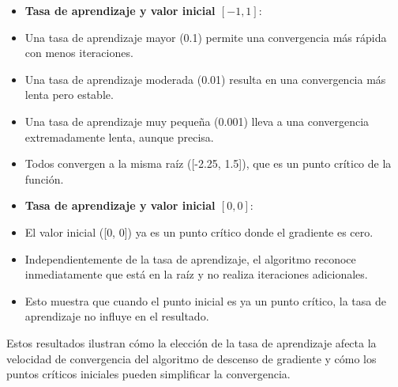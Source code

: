 \documentclass[11pt]{article}
\begin{document}
\begin{itemize}
\item
  \textbf{Tasa de aprendizaje y valor inicial \([-1, 1]\)}:
\item
  Una tasa de aprendizaje mayor (0.1) permite una convergencia más
  rápida con menos iteraciones.
\item
  Una tasa de aprendizaje moderada (0.01) resulta en una convergencia
  más lenta pero estable.
\item
  Una tasa de aprendizaje muy pequeña (0.001) lleva a una convergencia
  extremadamente lenta, aunque precisa.
\item
  Todos convergen a la misma raíz ({[}-2.25, 1.5{]}), que es un punto
  crítico de la función.
\item
  \textbf{Tasa de aprendizaje y valor inicial \([0, 0]\)}:
\item
  El valor inicial ({[}0, 0{]}) ya es un punto crítico donde el
  gradiente es cero.
\item
  Independientemente de la tasa de aprendizaje, el algoritmo reconoce
  inmediatamente que está en la raíz y no realiza iteraciones
  adicionales.
\item
  Esto muestra que cuando el punto inicial es ya un punto crítico, la
  tasa de aprendizaje no influye en el resultado.
\end{itemize}

Estos resultados ilustran cómo la elección de la tasa de aprendizaje
afecta la velocidad de convergencia del algoritmo de descenso de
gradiente y cómo los puntos críticos iniciales pueden simplificar la
convergencia.


    
    
    
\end{document}

